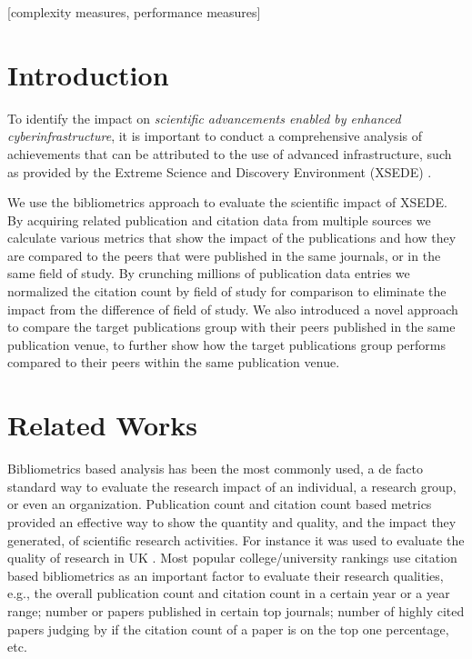 \documentclass{sig-alternate}
\begin{document}
\vspace{-6pt}

[complexity measures,
performance measures]



\section{Introduction} 

To identify the impact on {\em scientific advancements enabled by enhanced
cyberinfrastructure}, it is important to conduct a comprehensive analysis
of achievements that can be attributed to the use of advanced infrastructure,
such as provided by the Extreme Science and Discovery Environment (XSEDE) \cite{www-xsede,xsede}.

We use the bibliometrics approach to evaluate the scientific impact of XSEDE. By
acquiring related publication and citation data from multiple sources we calculate various
metrics that show the impact of the publications and how they are compared to the peers that
were published in the same journals, or in the same field of study. By crunching millions of
publication data entries we normalized the citation count by field of study for comparison to
eliminate the impact from the difference of field of study. We also introduced a novel approach
to compare the target publications group with their peers published in the same publication
venue, to further show how the target publications group performs compared to their peers
within the same publication venue.


\section{Related Works} \label{S:related}

Bibliometrics based analysis has been the most commonly used, a de facto standard way to evaluate the
research impact of an individual, a research group, or even an organization. Publication count
and citation count based metrics provided an effective way to show the quantity and quality,
and the impact they generated, of scientific research activities. For instance it was used to evaluate the
quality of research in UK \cite{thomas1998institutional, penfield2014assessment}. Most popular
college/university rankings use citation based bibliometrics as an important factor to evaluate
their research qualities, e.g., the overall publication count and citation count in a certain year
or a year range; number or papers published in certain top journals; number of highly cited papers
judging by if the citation count of a paper is on the top one percentage, etc.
\end{document}
